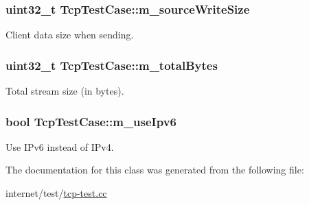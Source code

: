 \subsubsection[{\texorpdfstring{m\+\_\+source\+Write\+Size}{m_sourceWriteSize}}]{\setlength{\rightskip}{0pt plus 5cm}uint32\+\_\+t Tcp\+Test\+Case\+::m\+\_\+source\+Write\+Size\hspace{0.3cm}{\ttfamily [private]}}\hypertarget{classTcpTestCase_af2488464ac4a6aa734ab2fa3a8f1255e}{}\label{classTcpTestCase_af2488464ac4a6aa734ab2fa3a8f1255e}


Client data size when sending. 

\subsubsection[{\texorpdfstring{m\+\_\+total\+Bytes}{m_totalBytes}}]{\setlength{\rightskip}{0pt plus 5cm}uint32\+\_\+t Tcp\+Test\+Case\+::m\+\_\+total\+Bytes\hspace{0.3cm}{\ttfamily [private]}}\hypertarget{classTcpTestCase_a9b4497e157a0b1fb7fdf90e833696201}{}\label{classTcpTestCase_a9b4497e157a0b1fb7fdf90e833696201}


Total stream size (in bytes). 

\subsubsection[{\texorpdfstring{m\+\_\+use\+Ipv6}{m_useIpv6}}]{\setlength{\rightskip}{0pt plus 5cm}bool Tcp\+Test\+Case\+::m\+\_\+use\+Ipv6\hspace{0.3cm}{\ttfamily [private]}}\hypertarget{classTcpTestCase_a0fd3d3053ba2a160fbc60f6d40b5fe25}{}\label{classTcpTestCase_a0fd3d3053ba2a160fbc60f6d40b5fe25}


Use I\+Pv6 instead of I\+Pv4. 



The documentation for this class was generated from the following file\+:\begin{DoxyCompactItemize}
\item 
internet/test/\hyperlink{tcp-test_8cc}{tcp-\/test.\+cc}\end{DoxyCompactItemize}
